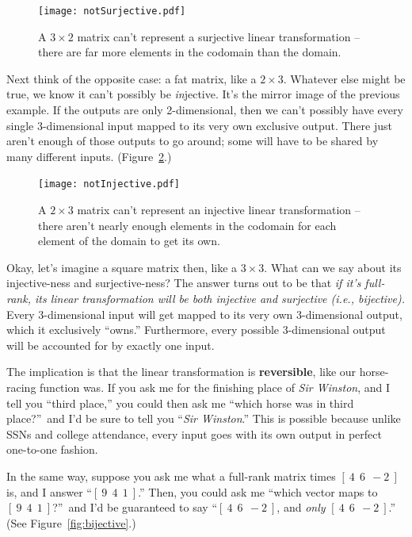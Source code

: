 \begin{figure}[ht]
\centering
\texttt{[image: notSurjective.pdf]}
\caption{A $3\times 2$ matrix can't represent a surjective linear
transformation -- there are far more elements in the codomain than the domain.}
\label{fig:notSurjective}
\end{figure}

Next think of the opposite case: a fat matrix, like a $2\times 3$. Whatever
else might be true, we know it can't possibly be \textit{in}jective. It's the
mirror image of the previous example. If the outputs are only 2-dimensional,
then we can't possibly have every single 3-dimensional input mapped to its very
own exclusive output. There just aren't enough of those outputs to go around;
some will have to be shared by many different inputs.
(Figure~\ref{fig:notInjective}.)

\begin{figure}[hb]
\centering
\texttt{[image: notInjective.pdf]}
\caption{A $2\times 3$ matrix can't represent an injective linear
transformation -- there aren't nearly enough elements in the codomain for each
element of the domain to get its own.}
\label{fig:notInjective}
\end{figure}


Okay, let's imagine a square matrix then, like a $3\times 3$. What can we say
about its injective-ness and surjective-ness? The answer turns out to be that
\textit{if it's full-rank, its linear transformation will be both injective and
surjective (i.e., bijective).} Every 3-dimensional input will get mapped to its
very own 3-dimensional output, which it exclusively ``owns.'' Furthermore,
every possible 3-dimensional output will be accounted for by exactly one input.

The implication is that the linear transformation is \textbf{reversible}, like
our horse-racing function was. If you ask me for the finishing place of
\textit{Sir Winston}, and I tell you ``third place,'' you could then ask me
``which horse was in third place?''~and I'd be sure to tell you ``\textit{Sir
Winston}.'' This is possible because unlike SSNs and college attendance, every
input goes with its own output in perfect one-to-one fashion.

In the same way, suppose you ask me what a full-rank matrix times $[\ 4\ \ 6\ \
-2\ ]$ is, and I answer ``$[\ 9\ \ 4\ \ 1\ ]$.'' Then, you could ask me ``which
vector maps to $[\ 9\ \ 4\ \ 1\ ]$?''~and I'd be guaranteed to say ``$[\ 4\ \
6\ \ -2\ ]$, and \textit{only} $[\ 4\ \ 6\ \ -2\ ]$.'' (See
Figure~\ref{fig:bijective}.)


